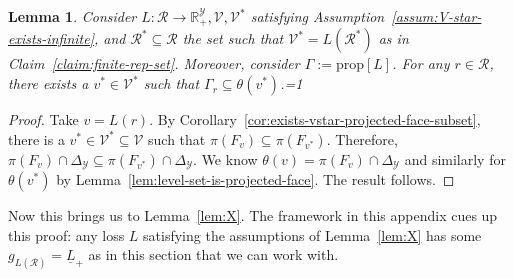 \documentclass[11pt]{article}
\newcommand{\Comments}{1}
\newcommand{\mytodo}[2]{\ifnum\Comments=1%
  \todo[linecolor=#1!80!black,backgroundcolor=#1,bordercolor=#1!80!black]{#2}\fi}
\newcommand{\btw}[1]{\mytodo{gray!20!white}{BTW: #1}}%
\newcommand{\reals}{\mathbb{R}}
\newcommand{\prop}[1]{\mathrm{prop}[#1]}
\newcommand{\simplex}{\Delta_\Y}
\newcommand{\R}{\mathcal{R}}
\newcommand{\V}{\mathcal{V}}
\newcommand{\Y}{\mathcal{Y}}
\newcommand{\risk}[1]{\underline{#1}}
\newtheorem{lemma}{Lemma}
\begin{document}
\begin{lemma}\label{lem:any-levelset-contained-in-minlevelset}
  Consider $L : \R \to \reals^\Y_+, \V, \V^*$ satisfying Assumption~\ref{assum:V-star-exists-infinite}, and $\R^* \subseteq \R$ the set such that $\V^* = L(\R^*)$ as in Claim~\ref{claim:finite-rep-set}.
  Moreover, consider $\Gamma := \prop{L}$.
  For any $r \in \R$, there exists a $v^* \in \V^*$ such that $\Gamma_r \subseteq \theta(v^*)$.\btw{(7)}
\end{lemma}
\begin{proof}
  Take $v = L(r)$.
  By Corollary~\ref{cor:exists-vstar-projected-face-subset}, there is a $v^* \in \V^* \subseteq \V$ such that $\pi(F_v) \subseteq \pi(F_{v^*})$.
  Therefore, $\pi(F_v) \cap \simplex \subseteq \pi(F_{v^*})\cap \simplex$.  
  We know $\theta(v) = \pi(F_v) \cap \simplex$ and similarly for $\theta(v^*)$ by Lemma~\ref{lem:level-set-is-projected-face}.
  The result follows.
\end{proof}



Now this brings us to Lemma~\ref{lem:X}.
The framework in this appendix cues up this proof: any loss $L$ satisfying the assumptions of Lemma~\ref{lem:X} has some $g_{L(\R)} = \risk{L}_+$ as in this section that we can work with. 
\end{document}
